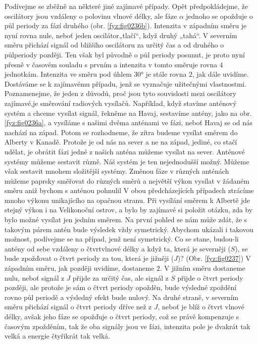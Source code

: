     Podívejme se zběžně na některé jiné zajímavé případy. Opět předpokládejme, že oscilátory jsou 
    vzdáleny o polovinu vlnové délky, ale fáze \(\alpha\) jednoho se opožduje o půl periody za fází 
    druhého (obr. \ref{fyz:fig0236b}). Intenzita v západním směru je nyní rovna nule, neboť jeden 
    oscilátor„tlačí“, když druhý „tahá“. V severním směru přichází signál od bližšího oscilátoru za 
    určitý čas a od druhého o půlperiody později. Ten však byl původně o půl periody posunut, je 
    proto nyní přesně v časovém souladu s prvním a intenzita v tomto směruje rovna \(4\) jednotkám. 
    Intenzita ve směru pod úhlem \ang{30} je stále rovna \(2\), jak dále uvidíme. Dostáváme se k 
    zajímavému případu, jenž se vyznačuje užitečnými vlastnostmi. Poznamenejme, že jeden z důvodů, 
    proč jsou tyto souvislosti mezi oscilátory zajímavé,je směrování radiových vysílačů. Například, 
    když stavíme anténový systém a chceme vysílat signál, řekněme na Havaj, sestavíme antény, jako 
    na obr. \ref{fyz:fig0236a}, a vysíláme s našimi dvěma anténami ve fázi, neboť Havaj se od nás 
    nachází na západ. Potom se rozhodneme, že zítra budeme vysílat směrem do Alberty v Kanadě. 
    Protože je od nás na sever a ne na západ, jediné, co stačí udělat, je obrátit fázi jedné z 
    našich anténa můžeme vysílat na sever. Anténové systémy můžeme sestavit různě. Náš systém je 
    ten nejednodušší možný. Můžeme však sestavit mnohem složitější systémy. Změnou fáze v různých 
    anténách můžeme paprsky směřovat do různých směrů a největší výkon vysílat v žádaném směru aniž 
    bychom s anténou pohnulil V obou předcházejících případech ztrácíme mnoho výkonu unikajícího na 
    opačnou stranu. Při vysílání směrem k Albertě jde stejný výkon i na Velikonoční ostrov, a bylo 
    by zajímavé si položit otázku, zda by bylo možné vysílat jen jedním směrem. Na první pohled se 
    nám může zdát, že s takovým párem antén bude výsledek vždy symetrický. Abychom ukázali i 
    takovou možnost, podívejme se na případ, jenž není symetrický. Co se stane, budou-li antény od 
    sebe vzdáleny o čtvrtvlnové délky a když ta, která je severněji (\(S\)), se bude zpožďovat o 
    čtvrt periody za tou, která je jižněji (\(J\))? (Obr. \ref{fyz:fig0237}) V západním směru, jak 
    později uvidíme, dostaneme \(2\). V jižním směru dostaneme nulu, neboť signál z \(J\) přijde za 
    určitý čas, ale signál z \(S\) přijde o čtvrt periody později, ale protože je sám o čtvrt 
    periody opožděn, bude výsledné zpoždění rovno půl periodě a výsledný efekt bude nulový. Na 
    druhé straně, v severním směru přichází signál o čtvrt periody dříve než z \(J\), neboť je blíž 
    o čtvrt vlnové délky, avšak jeho fáze se opožďuje o čtvrt periody, což se právě kompenzuje s 
    časovým zpožděním, tak že oba signály jsou ve fázi, intenzita pole je dvakrát tak velká a 
    energie čtyřikrát tak velká.

